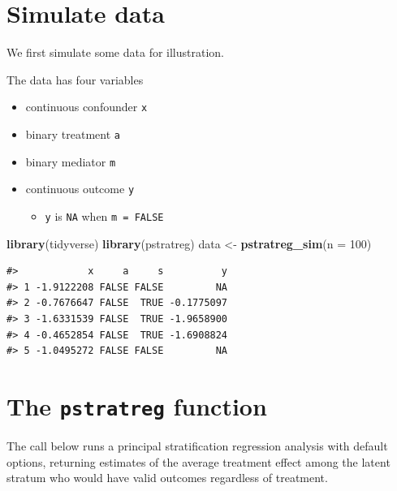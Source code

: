 \documentclass[
]{book}
\newenvironment{Shaded}{\begin{snugshade}}{\end{snugshade}}
\newcommand{\AttributeTok}[1]{\textcolor[rgb]{0.13,0.29,0.53}{#1}}
\newcommand{\DecValTok}[1]{\textcolor[rgb]{0.00,0.00,0.81}{#1}}
\newcommand{\FunctionTok}[1]{\textcolor[rgb]{0.13,0.29,0.53}{\textbf{#1}}}
\newcommand{\NormalTok}[1]{#1}
\newcommand{\OtherTok}[1]{\textcolor[rgb]{0.56,0.35,0.01}{#1}}
\providecommand{\tightlist}{%
  \setlength{\itemsep}{0pt}\setlength{\parskip}{0pt}}
\begin{document}
\section{Simulate data}\label{simulate-data}

We first simulate some data for illustration.

The data has four variables

\begin{itemize}
\tightlist
\item
  continuous confounder \texttt{x}
\item
  binary treatment \texttt{a}
\item
  binary mediator \texttt{m}
\item
  continuous outcome \texttt{y}

  \begin{itemize}
  \tightlist
  \item
    \texttt{y} is \texttt{NA} when \texttt{m\ =\ FALSE}
  \end{itemize}
\end{itemize}

\begin{Shaded}
\begin{Highlighting}[]
\FunctionTok{library}\NormalTok{(tidyverse)}
\FunctionTok{library}\NormalTok{(pstratreg)}
\NormalTok{data }\OtherTok{\textless{}{-}} \FunctionTok{pstratreg\_sim}\NormalTok{(}\AttributeTok{n =} \DecValTok{100}\NormalTok{)}
\end{Highlighting}
\end{Shaded}

\begin{verbatim}
#>            x     a     s          y
#> 1 -1.9122208 FALSE FALSE         NA
#> 2 -0.7676647 FALSE  TRUE -0.1775097
#> 3 -1.6331539 FALSE  TRUE -1.9658900
#> 4 -0.4652854 FALSE  TRUE -1.6908824
#> 5 -1.0495272 FALSE FALSE         NA
\end{verbatim}

\section{\texorpdfstring{The \texttt{pstratreg} function}{The pstratreg function}}\label{the-pstratreg-function}

The call below runs a principal stratification regression analysis with default options, returning estimates of the average treatment effect among the latent stratum who would have valid outcomes regardless of treatment.
\end{document}
